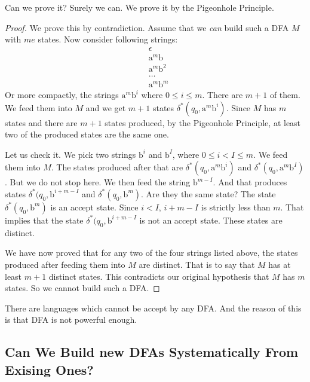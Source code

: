 \documentclass[11pt]{article}
\begin{document}
Can we prove it? Surely we can. We prove it by the Pigeonhole Principle.

\begin{proof}
We prove this by contradiction. Assume that we \emph{can} build such a DFA $M$ with
$me$ states. Now consider following strings:
\begin{align*}
&\epsilon \\
&\mathrm{a}^m\mathrm{b} \\
&\mathrm{a}^m\mathrm{b}^2 \\
&\dots \\
&\mathrm{a}^m\mathrm{b}^m
\end{align*}
Or more compactly, the strings $\mathrm{a}^m\mathrm{b}^i$ where $0 \leq i \leq m$. There are $m + 1$ of
them. We feed them into $M$ and we get $m + 1$ states $\delta ^ \ast(q_0, \mathrm{a}^m\mathrm{b}^i)$.
Since $M$ has $m$ states and there are $m + 1$ states produced, by the Pigeonhole
Principle, at least two of the produced states are the same one.

Let us check it. We pick two strings $\mathrm{b}^i$ and $\mathrm{b}^I$, where $0 \leq i < I \leq m$. We
feed them into $M$. The states produced after that are $\delta ^ \ast(q_0, \mathrm{a}^m\mathrm{b}^i)$
and $\delta ^ \ast(q_0, \mathrm{a}^m\mathrm{b}^I)$. But we do not stop here. We then feed the string
$\mathrm{b}^{m-I}$. And that produces states $\delta ^ \ast(q_0, \mathrm{b}^{i + m - I}$ and
$\delta ^ \ast(q_0, \mathrm{b}^m)$. Are they the same state? The state
$\delta ^ \ast(q_0, \mathrm{b}^m)$ is an accept state. Since $i < I$, $i + m - I$ is
strictly less than $m$. That implies that the state
$\delta ^ \ast(q_0, \mathrm{b}^{i + m - I}$ is not an accept state. These states are
distinct.

We have now proved that for any two of the four strings listed above, the states
produced after feeding them into $M$ are distinct. That is to say that $M$ has at
least $m + 1$ distinct states. This contradicts our original hypothesis that $M$ has
$m$ states. So we cannot build such a DFA.
\end{proof}

There are languages which cannot be accept by any DFA. And the reason of this is that
DFA is not powerful enough.

\subsection{Can We Build new DFAs Systematically From Exising Ones?} \label{subsec:3.3}
\end{document}
